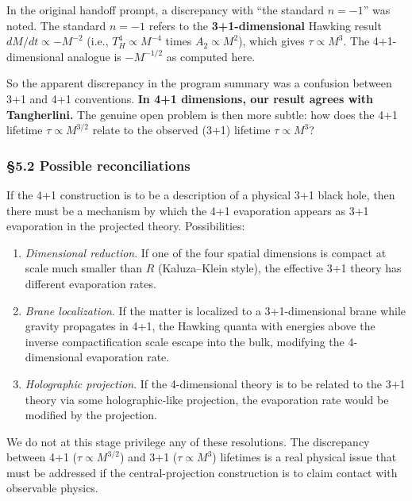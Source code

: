 \documentclass[a4paper,11pt]{article}
\theoremstyle{definition}
\providecommand{\tightlist}{\setlength{\itemsep}{0pt}\setlength{\parskip}{0pt}}
\begin{document}
In the original handoff prompt, a discrepancy with ``the standard
\(n = -1\)'' was noted. The standard \(n = -1\) refers to the
\textbf{3+1-dimensional} Hawking result \(dM/dt \propto -M^{-2}\) (i.e.,
\(T_H^4 \propto M^{-4}\) times \(A_2 \propto M^2\)), which gives
\(\tau \propto M^3\). The 4+1-dimensional analogue is \(-M^{-1/2}\) as
computed here.

So the apparent discrepancy in the program summary was a confusion
between 3+1 and 4+1 conventions. \textbf{In 4+1 dimensions, our result
agrees with Tangherlini.} The genuine open problem is then more subtle:
how does the 4+1 lifetime \(\tau \propto M^{3/2}\) relate to the
observed (3+1) lifetime \(\tau \propto M^3\)?

\subsubsection{§5.2 Possible
reconciliations}\label{possible-reconciliations}

If the 4+1 construction is to be a description of a physical 3+1 black
hole, then there must be a mechanism by which the 4+1 evaporation
appears as 3+1 evaporation in the projected theory. Possibilities:

\begin{enumerate}
\def\labelenumi{\arabic{enumi}.}
\tightlist
\item
  \emph{Dimensional reduction}. If one of the four spatial dimensions is
  compact at scale much smaller than \(R\) (Kaluza--Klein style), the
  effective 3+1 theory has different evaporation rates.
\item
  \emph{Brane localization}. If the matter is localized to a
  3+1-dimensional brane while gravity propagates in 4+1, the Hawking
  quanta with energies above the inverse compactification scale escape
  into the bulk, modifying the 4-dimensional evaporation rate.
\item
  \emph{Holographic projection}. If the 4-dimensional theory is to be
  related to the 3+1 theory via some holographic-like projection, the
  evaporation rate would be modified by the projection.
\end{enumerate}

We do not at this stage privilege any of these resolutions. The
discrepancy between 4+1 (\(\tau \propto M^{3/2}\)) and 3+1
(\(\tau \propto M^3\)) lifetimes is a real physical issue that must be
addressed if the central-projection construction is to claim contact
with observable physics.
\end{document}
